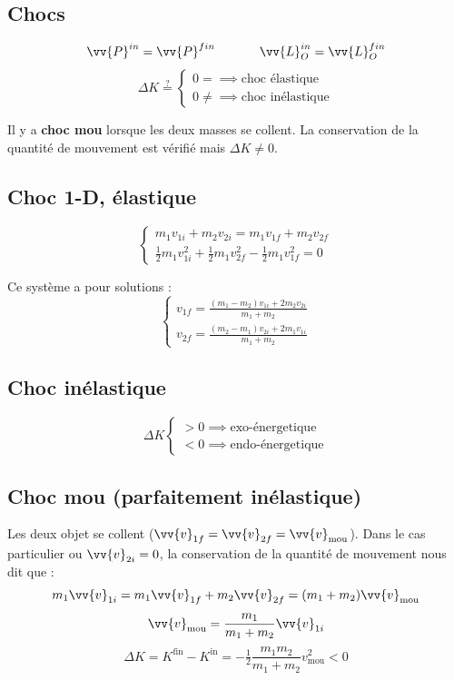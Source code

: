 \documentclass[landscape,a4paper]{article}
\newcommand{\Qm}{\ensuremath{\vv{P}}}
\newcommand{\vi}{\ensuremath{\vv{v}}}
\newcommand{\mc}{\ensuremath{\vv{L}}}
\begin{document}
\begin{multicols}{4}
  \section{Chocs}
  \[
    \Qm^{in}=\Qm^{fin} \phantom{texttext}
    \mc^{in}_O=\mc^{fin}_O
  \]
  \[ \Delta K \overset{?}{=}
    \begin{cases}
      0 = \implies \text{choc élastique}\\
      0 \neq \implies \text{choc inélastique}
    \end{cases}
  \]

  Il y a \textbf{choc mou} lorsque les deux masses se collent. La conservation de la quantité de mouvement est vérifié mais \(\Delta K \neq 0\).

  \subsection{Choc 1-D, élastique}
  \[
    \begin{cases}
      m_1 v_{1i} + m_2v_{2i} = m_1 v_{1f} + m_2 v_{2f} \\ 
      \tfrac{1}{2}m_1 v_{1i}^2 + \tfrac{1}{2}m_1 v_{2f}^2 - \tfrac{1}{2}m_1 v_{1f}^2 = 0
    \end{cases}
  \]

  Ce système a pour solutions :
  \[
    \begin{cases}
      v_{1f} = \frac{(m_1-m_2)v_{1i} + 2m_2v_{2i}}{m_1+m_2} \\
      v_{2f} = \frac{(m_2-m_1)v_{2i} + 2m_1v_{1i}}{m_1+m_2}
    \end{cases}
  \]

  \subsection{Choc inélastique}
  \[
    \Delta K 
    \begin{cases}
      > 0 \implies \text{exo-énergetique} \\
      < 0 \implies \text{endo-énergetique}
    \end{cases}
  \]

  \subsection{Choc mou (parfaitement inélastique)}
  Les deux objet se collent (\(\vi_{1f}=\vi_{2f}=\vi_{\text{mou}}\)). Dans le cas particulier ou \(\vi_{2i}=0\), la conservation de la quantité de mouvement nous dit que : 
  \[
    m_1\vi_{1i} = m_1\vi_{1f} + m_2\vi_{2f} = (m_1 + m_2)\vi_{\text{mou}} 
  \]
  \[
    \vi_{\text{mou}} = \frac{m_1}{m_1 + m_2}\vi_{1i}
  \]
  \[
    \Delta K = K^{\text{fin}} - K^{\text{in}}= -\tfrac{1}{2}\frac{m_1m_2}{m_1+m_2}v_{\text{mou}}^2 < 0 
  \]


\end{multicols}
\end{document}
